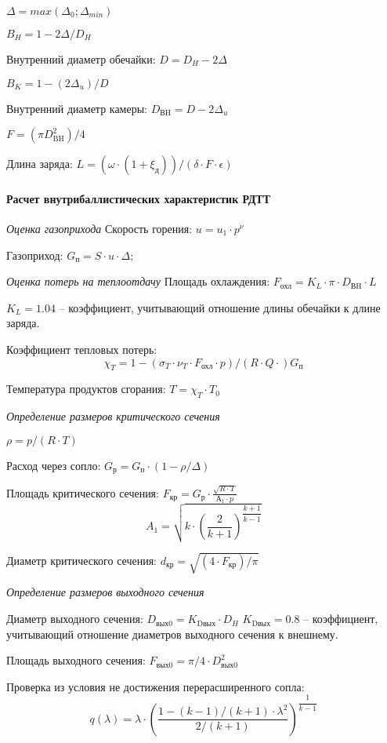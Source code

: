 $\Delta = max(\Delta_0; \Delta _{min})$

$B_H=1-2\Delta/D_H $

Внутренний диаметр обечайки:		$D=D_H  - 2\Delta $

$B_K=1-(2\Delta _u)/D$

Внутренний диаметр камеры:		$D_\text{ВH}=D - 2\Delta _u $

$F=(\pi D_\text{BH}^2)/4$

Длина заряда:				$L=(\omega \cdot (1+\xi_\text{д}))/(\delta \cdot F \cdot \epsilon)$


\paragraph{Расчет внутрибаллистических характеристик РДТТ}

\emph{Оценка газоприхода}
Скорость горения:				$u=u_1 \cdot p^\nu$

Газоприход:					$G_\text{п}=S \cdot u \cdot \Delta$;

\emph{Оценка потерь на теплоотдачу}
Площадь охлаждения:			$F_\text{охл}=K_L \cdot \pi  \cdot D_\text{ВH} \cdot L$

$K_L=1.04$  – коэффициент, учитывающий отношение длины обечайки к длине заряда.

Коэффициент тепловых потерь:	
$$	\chi_T=1-(\sigma_T \cdot \nu_T \cdot F_\text{охл} \cdot p)/(R \cdot Q \cdot ) G_\text{п}$$

Температура продуктов сгорания: 	$T=\chi_T \cdot T_0$

\emph{Определение размеров критического сечения}

$\rho=p/(R \cdot T)$

Расход через сопло:			$G_\text{р}=G_\text{п} \cdot (1-\rho/\Delta)$

Площадь критического сечения:	$F_\text{кр}=G_\text{р} \cdot \frac{\sqrt{R \cdot T}}{А_1 \cdot p}$
$$ A_1=\sqrt{k \cdot ( \dfrac{2}{k+1})^{\dfrac{k+1}{k-1} } }$$

Диаметр критического сечения:		$d_\text{кр}=\sqrt{(4 \cdot F_\text{кр})/\pi }$

\emph{Определение размеров выходного сечения}

Диаметр выходного сечения:		$D_\text{вых0}=K_\text{Dвых} \cdot D_H$
$K_\text{Dвых}=0.8$  – коэффициент, учитывающий отношение диаметров выходного сечения к внешнему.

Площадь выходного сечения:	$F_\text{вых0}=\pi /4 \cdot  D_\text{вых0}^2$

Проверка из условия не достижения перерасширенного сопла: 
$$q(\lambda )= \lambda  \cdot \left(\frac{1-(k-1)/(k+1) \cdot \lambda ^2}{2/(k+1)} \right) ^{\dfrac{1}{k-1}}$$


